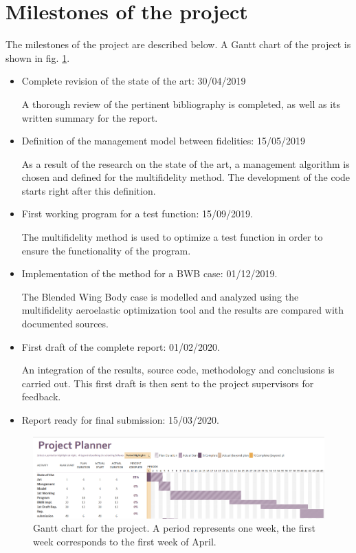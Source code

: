 \section{Milestones of the project}
\label{sec:milestones}
The milestones of the project are described below. A Gantt chart of the project is shown in fig. \ref{fig:gantt}.
\begin{itemize}
    \item Complete revision of the state of the art: 30/04/2019
    
    A thorough review of the pertinent bibliography is completed, as well as its written summary for the report.
    \item Definition of the management model between fidelities: 15/05/2019
    
    As a result of the research on the state of the art, a management algorithm is chosen and defined for the multifidelity method. The development of the code starts right after this definition.
    \item First working program for a test function: 15/09/2019.
    
    The multifidelity method is used to optimize a test function in order to ensure the functionality of the program. 
    \item Implementation of the method for a BWB case: 01/12/2019.
    
    The Blended Wing Body case is modelled and analyzed using the multifidelity aeroelastic optimization tool and the results are compared with documented sources.
    \item First draft of the complete report: 01/02/2020.
    
    An integration of the results, source code, methodology and conclusions is carried out. This first draft is then sent to the project supervisors for feedback.
    \item Report ready for final submission: 15/03/2020.
\end{itemize}
\begin{figure}
\centering
\includegraphics[width=\textwidth]{images/Gantt}
\caption{Gantt chart for the project. A period represents one week, the first week corresponds to the first week of April.}
\label{fig:gantt}
\end{figure}
